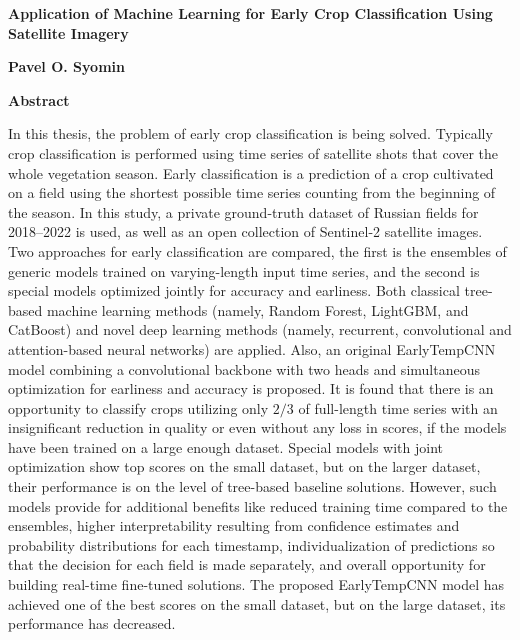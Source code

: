 \thispagestyle{plain}
\begin{center}
    \Large
    \textbf{Application of Machine Learning for Early Crop Classification Using Satellite Imagery}
    
    \vspace{0.4cm}
    \textbf{Pavel O. Syomin}
    
    \vspace{0.9cm}
    \textbf{Abstract}
\end{center}

In this thesis, the problem of early crop classification is being solved. Typically crop classification is performed using time series of satellite shots that cover the whole vegetation season. Early classification is a prediction of a crop cultivated on a field using the shortest possible time series counting from the beginning of the season. In this study, a private ground-truth dataset of Russian fields for 2018–2022 is used, as well as an open collection of Sentinel-2 satellite images. Two approaches for early classification are compared, the first is the ensembles of generic models trained on varying-length input time series, and the second is special models optimized jointly for accuracy and earliness. Both classical tree-based machine learning methods (namely, Random Forest, LightGBM, and CatBoost) and novel deep learning methods (namely, recurrent, convolutional and attention-based neural networks) are applied. Also, an original EarlyTempCNN model combining a convolutional backbone with two heads and simultaneous optimization for earliness and accuracy is proposed. It is found that there is an opportunity to classify crops utilizing only $2/3$ of full-length time series with an insignificant reduction in quality or even without any loss in scores, if the models have been trained on a large enough dataset. Special models with joint optimization show top scores on the small dataset, but on the larger dataset, their performance is on the level of tree-based baseline solutions. However, such models provide for additional benefits like reduced training time compared to the ensembles, higher interpretability resulting from confidence estimates and probability distributions for each timestamp, individualization of predictions so that the decision for each field is made separately, and overall opportunity for building real-time fine-tuned solutions. The proposed EarlyTempCNN model has achieved one of the best scores on the small dataset, but on the large dataset, its performance has decreased.


